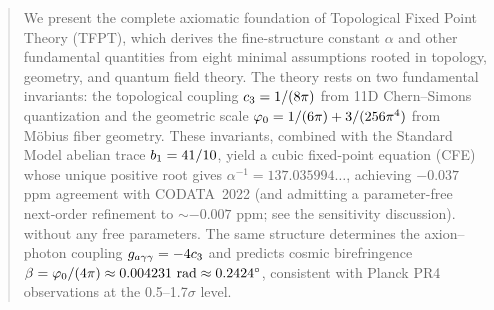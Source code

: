 
\maketitle

\begin{abstract}
We present the complete axiomatic foundation of Topological Fixed Point Theory (TFPT), 
which derives the fine-structure constant $\alpha$ and other fundamental quantities 
from eight minimal assumptions rooted in topology, geometry, and quantum field theory. 
The theory rests on two fundamental invariants: the topological coupling 
$\cthree = 1/(8\pi)$ from 11D Chern--Simons quantization and the geometric scale 
$\phiz = 1/(6\pi) + 3/(256\pi^4)$ from M\"obius fiber geometry. 
These invariants, combined with the Standard Model abelian trace $\bone = 41/10$, 
yield a cubic fixed-point equation (CFE) whose unique positive root gives 
$\alpha^{-1} = 137.035994\ldots$, achieving $-0.037$ ppm agreement with CODATA~2022
(and admitting a parameter-free next-order refinement to $\sim-0.007$ ppm; see the sensitivity discussion).
without any free parameters. The same structure determines the axion--photon coupling 
$\gagg = -4\cthree$ and predicts cosmic birefringence $\beta = \phiz/(4\pi) \approx 0.004231~\text{rad} \approx 0.2424^\circ$, 
consistent with Planck PR4 observations at the 0.5--1.7$\sigma$ level.
\end{abstract}

